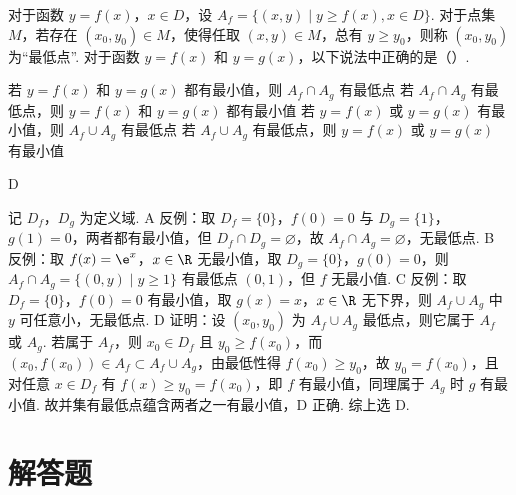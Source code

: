 \begin{problem}
对于函数 \(y=f(x)\)，\(x\in D\)，设 \(A_f=\{(x,y)\mid y\ge f(x),x\in D\}\). 对于点集 \(M\)，若存在 \((x_0,y_0)\in M\)，使得任取 \((x,y)\in M\)，总有 \(y\ge y_0\)，则称 \((x_0,y_0)\) 为“最低点”. 对于函数 \(y=f(x)\) 和 \(y=g(x)\)，以下说法中正确的是（\quad）.

\choices
    {若 \(y=f(x)\) 和 \(y=g(x)\) 都有最小值，则 \(A_f\cap A_g\) 有最低点}
    {若 \(A_f\cap A_g\) 有最低点，则 \(y=f(x)\) 和 \(y=g(x)\) 都有最小值}
    {若 \(y=f(x)\) 或 \(y=g(x)\) 有最小值，则 \(A_f\cup A_g\) 有最低点}
    {若 \(A_f\cup A_g\) 有最低点，则 \(y=f(x)\) 或 \(y=g(x)\) 有最小值}
\end{problem}

\begin{answer}
D
\end{answer}

\begin{solution}
记 \(D_f\)，\(D_g\) 为定义域. A 反例：取 \(D_f=\{0\}\)，\(f(0)=0\) 与 \(D_g=\{1\}\)，\(g(1)=0\)，两者都有最小值，但 \(D_f\cap D_g=\varnothing\)，故 \(A_f\cap A_g=\varnothing\)，无最低点. B 反例：取 \(f(x)=\e^x\)，\(x\in\R\) 无最小值，取 \(D_g=\{0\}\)，\(g(0)=0\)，则 \(A_f\cap A_g=\{(0,y)\mid y\ge1\}\) 有最低点 \((0,1)\)，但 \(f\) 无最小值. C 反例：取 \(D_f=\{0\}\)，\(f(0)=0\) 有最小值，取 \(g(x)=x\)，\(x\in\R\) 无下界，则 \(A_f\cup A_g\) 中 \(y\) 可任意小，无最低点. D 证明：设 \((x_0,y_0)\) 为 \(A_f\cup A_g\) 最低点，则它属于 \(A_f\) 或 \(A_g\). 若属于 \(A_f\)，则 \(x_0\in D_f\) 且 \(y_0\ge f(x_0)\)，而 \((x_0,f(x_0))\in A_f\subset A_f\cup A_g\)，由最低性得 \(f(x_0)\ge y_0\)，故 \(y_0=f(x_0)\)，且对任意 \(x\in D_f\) 有 \(f(x)\ge y_0=f(x_0)\)，即 \(f\) 有最小值，同理属于 \(A_g\) 时 \(g\) 有最小值. 故并集有最低点蕴含两者之一有最小值，D 正确. 综上选 D.
\end{solution}

\section{解答题}

